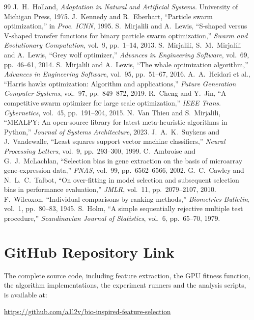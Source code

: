 \documentclass[12pt,a4paper]{report}
\begin{document}
\begin{thebibliography}{99}
 J.~H.~Holland, \emph{Adaptation in Natural and Artificial Systems}. University of Michigan Press, 1975.
 J.~Kennedy and R.~Eberhart, ``Particle swarm optimization,'' in \emph{Proc. ICNN}, 1995.
 S.~Mirjalili and A.~Lewis, ``S-shaped versus V-shaped transfer functions for binary particle swarm optimization,'' \emph{Swarm and Evolutionary Computation}, vol.~9, pp.~1--14, 2013.
 S.~Mirjalili, S.~M.~Mirjalili and A.~Lewis, ``Grey wolf optimizer,'' \emph{Advances in Engineering Software}, vol.~69, pp.~46--61, 2014.
 S.~Mirjalili and A.~Lewis, ``The whale optimization algorithm,'' \emph{Advances in Engineering Software}, vol.~95, pp.~51--67, 2016.
 A.~A.~Heidari et al., ``Harris hawks optimization: Algorithm and applications,'' \emph{Future Generation Computer Systems}, vol.~97, pp.~849--872, 2019.
 R.~Cheng and Y.~Jin, ``A competitive swarm optimizer for large scale optimization,'' \emph{IEEE Trans. Cybernetics}, vol.~45, pp.~191--204, 2015.
 N.~Van Thieu and S.~Mirjalili, ``MEALPY: An open-source library for latest meta-heuristic algorithms in Python,'' \emph{Journal of Systems Architecture}, 2023.
 J.~A.~K.~Suykens and J.~Vandewalle, ``Least squares support vector machine classifiers,'' \emph{Neural Processing Letters}, vol.~9, pp.~293--300, 1999.
 C.~Ambroise and G.~J.~McLachlan, ``Selection bias in gene extraction on the basis of microarray gene-expression data,'' \emph{PNAS}, vol.~99, pp.~6562--6566, 2002.
 G.~C.~Cawley and N.~L.~C.~Talbot, ``On over-fitting in model selection and subsequent selection bias in performance evaluation,'' \emph{JMLR}, vol.~11, pp.~2079--2107, 2010.
 F.~Wilcoxon, ``Individual comparisons by ranking methods,'' \emph{Biometrics Bulletin}, vol.~1, pp.~80--83, 1945.
 S.~Holm, ``A simple sequentially rejective multiple test procedure,'' \emph{Scandinavian Journal of Statistics}, vol.~6, pp.~65--70, 1979.
\end{thebibliography}

\chapter*{\centering GitHub Repository Link}
The complete source code, including feature extraction, the GPU fitness function, the algorithm implementations,
the experiment runners and the analysis scripts, is available at:

\begin{center}
\url{https://github.com/a1l2v/bio-inspired-feature-selection}
\end{center}
\end{document}
